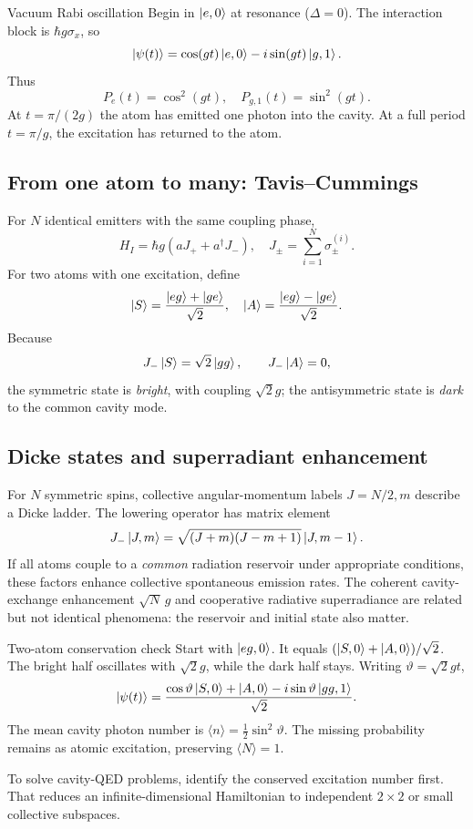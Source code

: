 \begin{worked}{Vacuum Rabi oscillation}
Begin in \(\left\lvert e,0\right\rangle\) at resonance
(\(\Delta=0\)). The interaction block is
\(\hbar g\sigma_x\), so
\[
\left\lvert \psi(t)\right\rangle
=\cos(gt)\left\lvert e,0\right\rangle
-i\sin(gt)\left\lvert g,1\right\rangle.
\]
Thus
\[
\boxed{P_e(t)=\cos^2(gt),\quad
P_{g,1}(t)=\sin^2(gt)}.
\]
At \(t=\pi/(2g)\) the atom has emitted
one photon into the cavity.
At a full period \(t=\pi/g\),
the excitation has returned to the atom.
\end{worked}

\subsection{From one atom to many: Tavis--Cummings}
For \(N\) identical emitters with the same
coupling phase,
\[
H_I=\hbar g(aJ_++a^\dagger J_-),\quad
J_\pm=\sum_{i=1}^N\sigma_\pm^{(i)}.
\]
For two atoms with one excitation, define
\[
\left\lvert S\right\rangle=\frac{\left\lvert eg\right\rangle+\left\lvert ge\right\rangle}{\sqrt2},
\quad
\left\lvert A\right\rangle=\frac{\left\lvert eg\right\rangle-\left\lvert ge\right\rangle}{\sqrt2}.
\]
Because
\[
J_-\left\lvert S\right\rangle=\sqrt2\left\lvert gg\right\rangle,\qquad
J_-\left\lvert A\right\rangle=0,
\]
the symmetric state is \emph{bright},
with coupling \(\sqrt2g\);
the antisymmetric state is \emph{dark}
to the common cavity mode.

\subsection{Dicke states and superradiant enhancement}
For \(N\) symmetric spins, collective
angular-momentum labels \(J=N/2,m\)
describe a Dicke ladder. The lowering operator
has matrix element
\[
J_-\left\lvert J,m\right\rangle=
\sqrt{(J+m)(J-m+1)}\left\lvert J,m-1\right\rangle.
\]
If all atoms couple to a \emph{common}
radiation reservoir under appropriate
conditions, these factors enhance
collective spontaneous emission rates.
The coherent cavity-exchange enhancement
\(\sqrt N\,g\) and cooperative radiative
superradiance are related but not
identical phenomena: the reservoir and
initial state also matter.

\begin{worked}{Two-atom conservation check}
Start with \(\left\lvert eg,0\right\rangle\).
It equals \((\left\lvert S,0\right\rangle+\left\lvert A,0\right\rangle)/\sqrt2\).
The bright half oscillates with
\(\sqrt2g\), while the dark half stays.
Writing \(\vartheta=\sqrt2gt\),
\[
\left\lvert \psi(t)\right\rangle
=\frac{\cos\vartheta\left\lvert S,0\right\rangle+\left\lvert A,0\right\rangle
-i\sin\vartheta\left\lvert gg,1\right\rangle}{\sqrt2}.
\]
The mean cavity photon number is
\(\langle n\rangle=\tfrac12\sin^2\vartheta\).
The missing probability remains as atomic
excitation, preserving \(\langle N\rangle=1\).
\end{worked}

\begin{checkpoint}
To solve cavity-QED problems, identify
the conserved excitation number first.
That reduces an infinite-dimensional
Hamiltonian to independent \(2\times2\)
or small collective subspaces.
\end{checkpoint}
